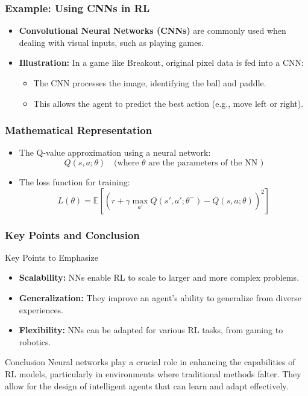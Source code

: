 \documentclass[aspectratio=169]{beamer}
\begin{document}
\begin{frame}[fragile]
    \frametitle{Example: Using CNNs in RL}
    \begin{itemize}
        \item \textbf{Convolutional Neural Networks (CNNs)} are commonly used when dealing with visual inputs, such as playing games.
        \item \textbf{Illustration:} In a game like Breakout, original pixel data is fed into a CNN:
        \begin{itemize}
            \item The CNN processes the image, identifying the ball and paddle.
            \item This allows the agent to predict the best action (e.g., move left or right).
        \end{itemize}
    \end{itemize}
\end{frame}

\begin{frame}[fragile]
    \frametitle{Mathematical Representation}
    \begin{itemize}
        \item The Q-value approximation using a neural network:
        \begin{equation}
            Q(s, a; \theta) \quad \text{(where } \theta \text{ are the parameters of the NN )}
        \end{equation}
        
        \item The loss function for training:
        \begin{equation}
            L(\theta) = \mathbb{E}\left[(r + \gamma \max_{a'} Q(s', a'; \theta^-) - Q(s, a; \theta))^2\right]
        \end{equation}
    \end{itemize}
\end{frame}

\begin{frame}[fragile]
    \frametitle{Key Points and Conclusion}
    \begin{block}{Key Points to Emphasize}
        \begin{itemize}
            \item \textbf{Scalability:} NNs enable RL to scale to larger and more complex problems.
            \item \textbf{Generalization:} They improve an agent's ability to generalize from diverse experiences.
            \item \textbf{Flexibility:} NNs can be adapted for various RL tasks, from gaming to robotics.
        \end{itemize}
    \end{block}
    \begin{block}{Conclusion}
        Neural networks play a crucial role in enhancing the capabilities of RL models, particularly in environments where traditional methods falter. They allow for the design of intelligent agents that can learn and adapt effectively. 
    \end{block}
\end{frame}
\end{document}
